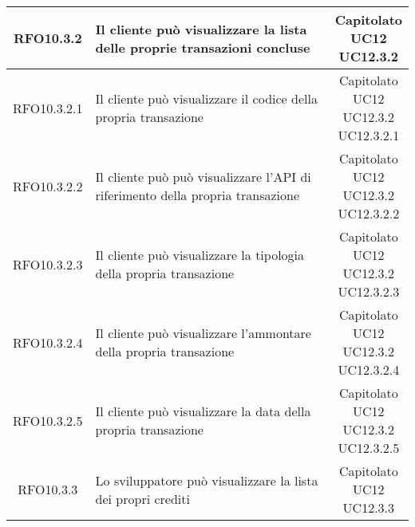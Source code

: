 \begin{longtable}{|c|p{8cm}|c|}
\hypertarget{RFO10.3.2}{RFO10.3.2} & Il cliente può visualizzare la lista delle proprie transazioni concluse & \makecell*{Capitolato\\UC12\\UC12.3.2} \\
\hline

\hypertarget{RFO10.3.2.1}{RFO10.3.2.1} & Il cliente può visualizzare il codice della propria transazione & \makecell*{Capitolato\\UC12\\UC12.3.2\\UC12.3.2.1} \\
\hline
\hypertarget{RFO10.3.2.2}{RFO10.3.2.2} & Il cliente può può visualizzare l'API di riferimento della propria transazione & \makecell*{Capitolato\\UC12\\UC12.3.2\\UC12.3.2.2} \\
\hline
\hypertarget{RFO10.3.2.3}{RFO10.3.2.3} & Il cliente può visualizzare la tipologia della propria transazione & \makecell*{Capitolato\\UC12\\UC12.3.2\\UC12.3.2.3} \\
\hline
\hypertarget{RFO10.3.2.4}{RFO10.3.2.4} & Il cliente può visualizzare l'ammontare della propria transazione & \makecell*{Capitolato\\UC12\\UC12.3.2\\UC12.3.2.4} \\
\hline
\hypertarget{RFO10.3.2.5}{RFO10.3.2.5} & Il cliente può visualizzare la data della propria transazione & \makecell*{Capitolato\\UC12\\UC12.3.2\\UC12.3.2.5} \\
\hline

\hypertarget{RFO10.3.3}{RFO10.3.3} & Lo sviluppatore può visualizzare la lista dei propri crediti & \makecell*{Capitolato\\UC12\\UC12.3.3} \\
\hline


\end{longtable}
